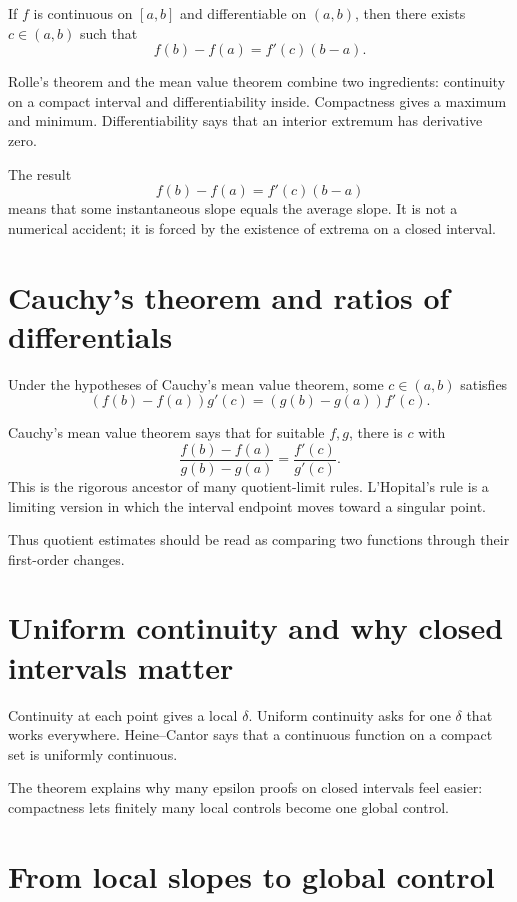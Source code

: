 \begin{theorem}
If \(f\) is continuous on \([a,b]\) and differentiable on \((a,b)\), then there exists \(c\in(a,b)\) such that
\[
  f(b)-f(a)=f'(c)(b-a).
\]
\end{theorem}


Rolle's theorem and the mean value theorem combine two ingredients: continuity on a compact interval and differentiability inside.  Compactness gives a maximum and minimum.  Differentiability says that an interior extremum has derivative zero.

The result
\[
  f(b)-f(a)=f'(c)(b-a)
\]
means that some instantaneous slope equals the average slope.  It is not a numerical accident; it is forced by the existence of extrema on a closed interval.

\section{Cauchy's theorem and ratios of differentials}

\begin{theorem}
Under the hypotheses of Cauchy's mean value theorem, some \(c\in(a,b)\) satisfies
\[
  (f(b)-f(a))g'(c)=(g(b)-g(a))f'(c).
\]
\end{theorem}


Cauchy's mean value theorem says that for suitable \(f,g\), there is \(c\) with
\[
  \frac{f(b)-f(a)}{g(b)-g(a)}=\frac{f'(c)}{g'(c)}.
\]
This is the rigorous ancestor of many quotient-limit rules.  L'Hopital's rule is a limiting version in which the interval endpoint moves toward a singular point.

Thus quotient estimates should be read as comparing two functions through their first-order changes.

\section{Uniform continuity and why closed intervals matter}

Continuity at each point gives a local \(\delta\).  Uniform continuity asks for one \(\delta\) that works everywhere.  Heine--Cantor says that a continuous function on a compact set is uniformly continuous.

The theorem explains why many epsilon proofs on closed intervals feel easier: compactness lets finitely many local controls become one global control.

\section{From local slopes to global control}


